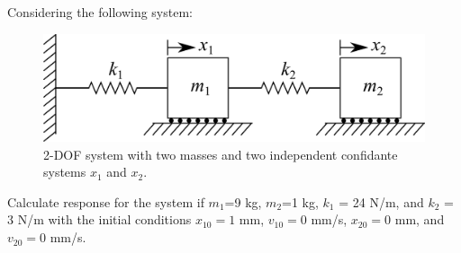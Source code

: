 \documentclass[12pt,letter]{article}
\begin{document}
	\begin{example}
	\label{ex:2-DOF}
	Considering the following system:
	\begin{figure}[H]
		\centering
		\includegraphics[]{../figures/2-DOF-spring_mass_horizontal.png}
		\caption{2-DOF system with two masses and two independent confidante systems $x_1$ and $x_2$.}
	\end{figure}
	Calculate response for the system if $m_1$=9 kg, $m_2$=1 kg, $k_1$ = 24 N/m, and $k_2$ = 3 N/m with the initial conditions $x_{10}=1$ mm, $v_{10}=0$ mm/s, $x_{20}=0$ mm, and $v_{20}=0$ mm/s. \\
	

\end{example}
\end{document}
